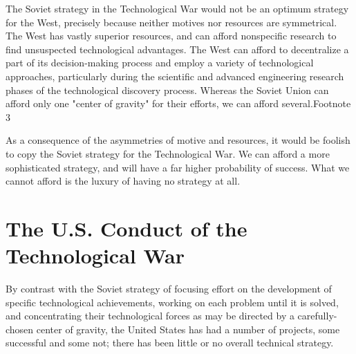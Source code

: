 \documentclass[a4paper,12pt]{book}
\begin{document}
The Soviet strategy in the Technological War would not be an optimum strategy for the West, precisely because neither motives nor resources are symmetrical. The West has vastly superior resources, and can afford nonspecific research to find unsuspected technological advantages. The West can afford to decentralize a part of its decision-making process and employ a variety of technological approaches, particularly during the scientific and advanced engineering research phases of the technological discovery process. Whereas the Soviet Union can afford only one "center of gravity" for their efforts, we can afford several.Footnote 3

As a consequence of the asymmetries of motive and resources, it would be foolish to copy the Soviet strategy for the Technological War. We can afford a more sophisticated strategy, and will have a far higher probability of success. What we cannot afford is the luxury of having no strategy at all.

\section{The U.S. Conduct of the Technological War}
By contrast with the Soviet strategy of focusing effort on the development of specific technological achievements, working on each problem until it is solved, and concentrating their technological forces as may be directed by a carefully-chosen center of gravity, the United States has had a number of projects, some successful and some not; there has been little or no overall technical strategy.
\end{document}
